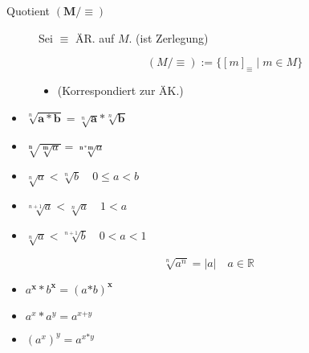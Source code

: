 \documentclass[uniLeipzig]{merkzettel}
\begin{document}
\begin{mzImportant}
\begin{description}
    \item [Quotient $\mathbf{(M / \equiv)}$]
          Sei $\equiv$ ÄR. auf $M$. (ist Zerlegung)

          $$(M / \equiv) := \{ [m]_\equiv \mid m \in M \}$$

          \begin{itemize}
            \item (Korrespondiert zur ÄK.)
          \end{itemize}
  \end{description}
\end{mzImportant}

\begin{mzImportant}
  \begin{itemize}
    \item $\sqrt[n]{\mathbf{a * b}} = \sqrt[n]{\mathbf{a}} \mathbin{\boldsymbol{*}} \sqrt[n]{\mathbf{b}}$

    \item $\sqrt[\mathbf{n}]{ \sqrt[\mathbf{m}]{a} } = \sqrt[\mathbf{n * m}]{a}$

    \item $\sqrt[n]{a} < \sqrt[n]{b} \quad 0 \leq a < b$

    \item $\sqrt[n+1]{a} < \sqrt[n]{a} \quad 1 < a$

    \item $\sqrt[n]{a} < \sqrt[n+1]{b} \quad 0 < a < 1$
  \end{itemize}

  $$\sqrt[n]{a^n} = |a| \quad a \in \mathbb{R}$$
\end{mzImportant}

\begin{mzImportant}
  \begin{itemize}
    \item $a^{\mathbf{x}} * b^{\mathbf{x}} = (a \mathbf{*} b)^{\mathbf{x}}$

    \item $a^x * a^y = a^{x \boldsymbol{+} y}$

    \item $(a^x)^y = a^{x \boldsymbol{*} y}$

  \end{itemize}
\end{mzImportant}
\end{document}
